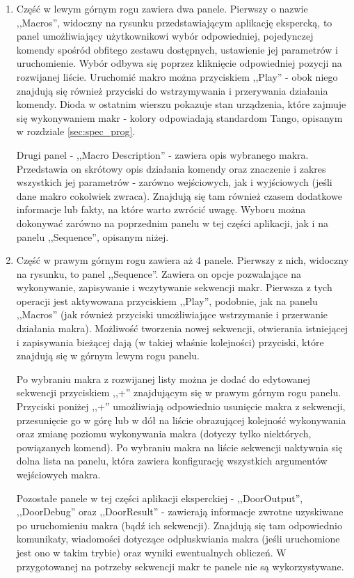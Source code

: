 \begin{enumerate}
	\item Część w lewym górnym rogu zawiera dwa panele. Pierwszy o nazwie ,,Macros'', widoczny na rysunku przedstawiającym aplikację ekspercką, to panel umożliwiający użytkownikowi wybór odpowiedniej, pojedynczej komendy spośród obfitego zestawu dostępnych, ustawienie jej parametrów i uruchomienie. Wybór odbywa się poprzez kliknięcie odpowiedniej pozycji na rozwijanej liście. Uruchomić makro można przyciskiem ,,Play'' - obok niego znajdują się również przyciski do wstrzymywania i przerywania działania komendy. Dioda w ostatnim wierszu pokazuje stan urządzenia, które zajmuje się wykonywaniem makr - kolory odpowiadają standardom Tango, opisanym w rozdziale \ref{sec:spec_prog}.
	
	Drugi panel - ,,Macro Description'' - zawiera opis wybranego makra. Przedstawia on skrótowy opis działania komendy oraz znaczenie i zakres wszystkich jej parametrów - zarówno wejściowych, jak i wyjściowych (jeśli dane makro cokolwiek zwraca). Znajdują się tam również czasem dodatkowe informacje lub fakty, na które warto zwrócić uwagę. Wyboru można dokonywać zarówno na poprzednim panelu w tej części aplikacji, jak i na panelu ,,Sequence'', opisanym niżej.
	
	\item Część w prawym górnym rogu zawiera aż 4 panele. Pierwszy z nich, widoczny na rysunku, to panel ,,Sequence''. Zawiera on opcje pozwalające na wykonywanie, zapisywanie i wczytywanie sekwencji makr. Pierwsza z tych operacji jest aktywowana przyciskiem ,,Play'', podobnie, jak na panelu ,,Macros'' (jak również przyciski umożliwiające wstrzymanie i przerwanie działania makra). Możliwość tworzenia nowej sekwencji, otwierania istniejącej i zapisywania bieżącej dają (w takiej właśnie kolejności) przyciski, które znajdują się w górnym lewym rogu panelu.
	
	Po wybraniu makra z rozwijanej listy można je dodać do edytowanej sekwencji przyciskiem ,,+'' znajdującym się w prawym górnym rogu panelu. Przyciski poniżej ,,+'' umożliwiają odpowiednio usunięcie makra z sekwencji, przesunięcie go w górę lub w dół na liście obrazującej kolejność wykonywania oraz zmianę poziomu wykonywania makra (dotyczy tylko niektórych, powiązanych komend). Po wybraniu makra na liście sekwencji uaktywnia się dolna lista na panelu, która zawiera konfigurację wszystkich argumentów wejściowych makra.
	
	Pozostałe panele w tej części aplikacji eksperckiej - ,,DoorOutput'', ,,DoorDebug'' oraz ,,DoorResult'' - zawierają informacje zwrotne uzyskiwane po uruchomieniu makra (bądź ich sekwencji). Znajdują się tam odpowiednio komunikaty, wiadomości dotyczące odpluskwiania makra (jeśli uruchomione jest ono w takim trybie) oraz wyniki ewentualnych obliczeń. W przygotowanej na potrzeby sekwencji makr te panele nie są wykorzystywane.
	

\end{enumerate}
